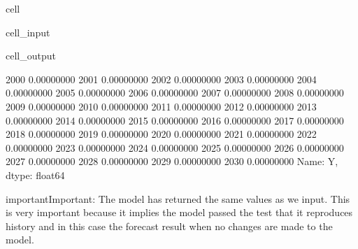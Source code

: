 \documentclass[letterpaper,10pt,english]{jupyterBook}
\begin{document}
\begin{sphinxuseclass}{cell}\begin{sphinxVerbatimInput}

\begin{sphinxuseclass}{cell_input}
\begin{sphinxVerbatim}[commandchars=\\\{\}]
  
    \PYG{p}{[}\PYG{p}{]}\PYG{p}{[}\PYG{p}{]}
\end{sphinxVerbatim}

\end{sphinxuseclass}\end{sphinxVerbatimInput}
\begin{sphinxVerbatimOutput}

\begin{sphinxuseclass}{cell_output}
\begin{sphinxVerbatim}[commandchars=\\\{\}]
2000   0.00000000
2001   0.00000000
2002   0.00000000
2003   0.00000000
2004   0.00000000
2005   0.00000000
2006   0.00000000
2007   0.00000000
2008   0.00000000
2009   0.00000000
2010   0.00000000
2011   0.00000000
2012   0.00000000
2013   0.00000000
2014   0.00000000
2015   0.00000000
2016   0.00000000
2017   0.00000000
2018   0.00000000
2019   0.00000000
2020   0.00000000
2021   0.00000000
2022   0.00000000
2023   0.00000000
2024   0.00000000
2025   0.00000000
2026   0.00000000
2027   0.00000000
2028   0.00000000
2029   0.00000000
2030   0.00000000
Name: Y, dtype: float64
\end{sphinxVerbatim}

\end{sphinxuseclass}\end{sphinxVerbatimOutput}

\end{sphinxuseclass}
\begin{sphinxadmonition}{important}{Important:}
\sphinxAtStartPar
The model has returned the same values as we input. This is very important because it implies the model passed the test that it reproduces history and in this case the forecast result when no changes are made to the model.
\end{sphinxadmonition}
\end{document}
